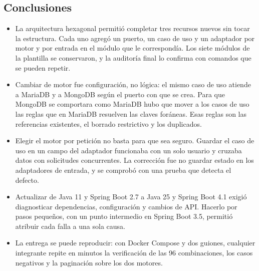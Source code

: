 \documentclass[11pt,a4paper]{article}
\begin{document}
\subsection{Conclusiones}
\begin{itemize}
\item La arquitectura hexagonal permitió completar tres recursos nuevos sin tocar
la estructura. Cada uno agregó un puerto, un caso de uso y un adaptador por
motor y por entrada en el módulo que le correspondía. Los siete módulos de la
plantilla se conservaron, y la auditoría final lo confirma con comandos que se
pueden repetir.
\item Cambiar de motor fue configuración, no lógica: el mismo caso de uso atiende
a MariaDB y a MongoDB según el puerto con que se crea. Para que MongoDB se
comportara como MariaDB hubo que mover a los casos de uso las reglas que en
MariaDB resuelven las claves foráneas. Esas reglas son las referencias
existentes, el borrado restrictivo y los duplicados.
\item Elegir el motor por petición no basta para que sea seguro. Guardar el caso
de uso en un campo del adaptador funcionaba con un solo usuario y cruzaba datos
con solicitudes concurrentes. La corrección fue no guardar estado en los
adaptadores de entrada, y se comprobó con una prueba que detecta el defecto.
\item Actualizar de Java 11 y Spring Boot 2.7 a Java 25 y Spring Boot 4.1 exigió
diagnosticar dependencias, configuración y cambios de API. Hacerlo por pasos
pequeños, con un punto intermedio en Spring Boot 3.5, permitió atribuir cada
falla a una sola causa.
\item La entrega se puede reproducir: con Docker Compose y dos guiones, cualquier
integrante repite en minutos la verificación de las 96 combinaciones, los casos
negativos y la paginación sobre los dos motores.
\end{itemize}
\end{document}
